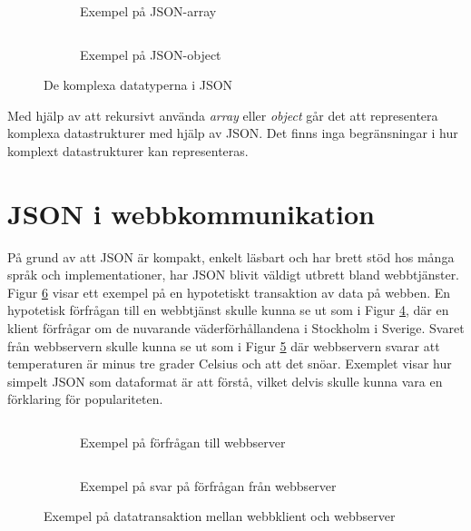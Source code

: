 \begin{figure}
	\begin{subfigure}[t]{0.47\textwidth}
		\inputminted[tabsize=2, frame=single, fontsize=\small, framesep=2mm]{json}{code/simple/array.json}
		\vspace{-1.2em}
		\caption{Exempel på JSON-array}
		\label{fig:json-array-example}
	\end{subfigure}\hfill
	\begin{subfigure}[t]{0.47\textwidth}
		\inputminted[tabsize=2, frame=single, fontsize=\small, framesep=2mm]{json}{code/simple/object.json}
		\vspace{-1.2em}
		\caption{Exempel på JSON-object}
		\label{fig:json-object-example}
	\end{subfigure}
	\caption{De komplexa datatyperna i JSON}
	\label{fig:json-komplex-example}
\end{figure}

\noindent
Med hjälp av att rekursivt använda \textit{array} eller \textit{object} går det att representera komplexa datastrukturer med hjälp av JSON. Det finns inga begränsningar i hur komplext datastrukturer kan representeras.

\section{JSON i webbkommunikation}
\label{sec:teori:json-web}
På grund av att JSON är kompakt, enkelt läsbart och har brett stöd hos många språk och implementationer, har JSON blivit väldigt utbrett bland webbtjänster. Figur \ref{fig:json-exchange-example} visar ett exempel på en hypotetiskt transaktion av data på webben. En hypotetisk förfrågan till en webbtjänst skulle kunna se ut som i Figur \ref{fig:json-request-example}, där en klient förfrågar om de nuvarande väderförhållandena i Stockholm i Sverige. Svaret från webbservern skulle kunna se ut som i Figur \ref{fig:json-response-example} där webbservern svarar att temperaturen är minus tre grader Celsius och att det snöar. Exemplet visar hur simpelt JSON som dataformat är att förstå, vilket delvis skulle kunna vara en förklaring för populariteten.

\begin{figure}
	\begin{subfigure}[t]{0.47\textwidth}
		\inputminted[tabsize=2, frame=single, fontsize=\small, framesep=2mm]{json}{code/simple/request.json}
		\vspace{-1.2em}
		\caption{Exempel på förfrågan till webbserver}
		\label{fig:json-request-example}
	\end{subfigure}\hfill
	\begin{subfigure}[t]{0.47\textwidth}
		\inputminted[tabsize=2, frame=single, fontsize=\small, framesep=2mm]{json}{code/simple/response.json}
		\vspace{-1.2em}
		\caption{Exempel på svar på förfrågan från webbserver}
		\label{fig:json-response-example}
	\end{subfigure}
	\caption{Exempel på datatransaktion mellan webbklient och webbserver}
	\label{fig:json-exchange-example}
\end{figure}

